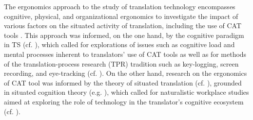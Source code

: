 The ergonomics approach to the study of translation technology encompasses cognitive, physical, and organizational ergonomics to investigate the impact of various factors on the situated activity of translation, including the use of CAT tools \citep[63]{ehrensberger2014a}. This approach was informed, on the one hand, by the cognitive paradigm in TS (cf. \cite[Chapter 2]{walker2021cognitive}), which called for explorations of issues such as cognitive load and mental processes inherent to translators’ use of CAT tools as well as for methods of the translation-process research (TPR) tradition such as key-logging, screen recording, and eye-tracking (cf. \cite{jakobsen2017translation}). On the other hand, research on the ergonomics of CAT tool was informed by the theory of situated translation (cf. \cite{risku2002situatedness,risku2004interkulturelle}), grounded in situated cognition theory (e.g. \cite{brown1989situated}), which called for naturalistic workplace studies aimed at exploring the role of technology in the translator’s cognitive ecosystem (cf. \cite{ehrensberger2019ergonomics,ehrensberger2015ergonomics}).

